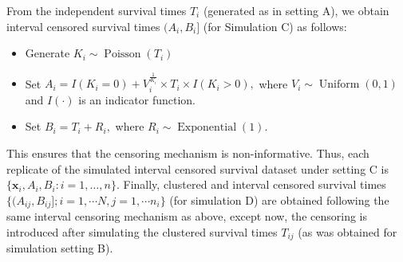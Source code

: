 \documentclass[11pt]{article}
\newcommand{\Poisson}{\operatorname{Poisson}}
\newcommand{\Uniform}{\operatorname{Uniform}}
\begin{document}
 
 
 From the independent survival times $T_i$ (generated as in setting A), we obtain interval censored survival times $(A_{i}, B_{i}]$ (for Simulation C) as follows:
 \begin{itemize}
     \item Generate $K_i \sim \Poisson(T_i)$
     \item Set $A_i = I(K_i = 0) + V_i^{\frac{1}{K_i}}\times T_i \times I(K_i >0),$ where $V_i \sim \Uniform(0,1)$ and $I(\cdot)$ is an indicator function.
     \item Set $B_i = T_i + R_i,$ where $R_i \sim \operatorname{Exponential}(1).$
 \end{itemize}
 This ensures that the censoring mechanism is non-informative. Thus, each replicate of the simulated interval censored survival dataset under setting C is $\{\mathbf{x}_i, A_i, B_i: i=1, \dots, n\}.$ Finally, clustered and interval censored survival times $\{(A_{ij}, B_{ij}]; i=1,\cdots N, j=1,\cdots n_i\}$ (for simulation D) are obtained following the same interval censoring mechanism as above, except now, the censoring is introduced after simulating the clustered survival times $T_{ij}$ (as was obtained for simulation setting B).
 
\end{document}
